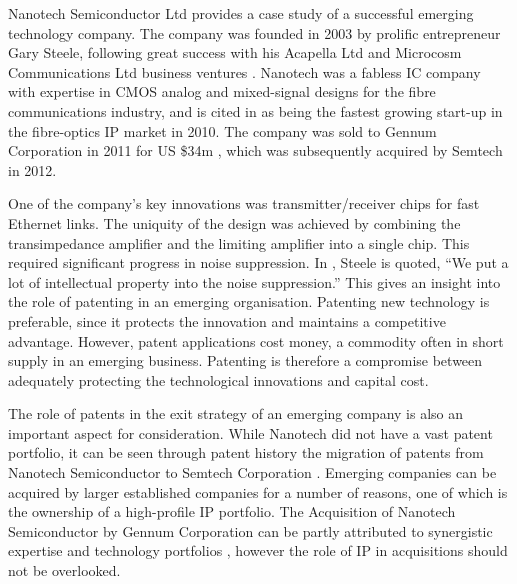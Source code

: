 {}
Nanotech Semiconductor Ltd provides a case study of a successful emerging technology company. 
The company was founded in 2003 by prolific entrepreneur Gary Steele, following great success with his Acapella Ltd and Microcosm Communications Ltd business ventures \cite{GazNesta}.
Nanotech was a fabless IC company with expertise in CMOS analog and mixed-signal designs for the fibre communications industry, and is cited in \cite{GazLightwave} as being the fastest growing start-up in the fibre-optics IP market in 2010.
The company was sold to Gennum Corporation in 2011 for US \$34m \cite{GazBloom}, which was subsequently acquired by Semtech in 2012.
 
One of the company's key innovations was transmitter/receiver chips for fast Ethernet links.
The uniquity of the design was achieved by combining the transimpedance amplifier and the limiting amplifier into a single chip.
This required significant progress in noise suppression.
In \cite{GazEW}, Steele is quoted, ``We put a lot of intellectual property into the noise suppression.''
This gives an insight into the role of patenting in an emerging organisation.
Patenting new technology is preferable, since it protects the innovation and maintains a competitive advantage.
However, patent applications cost money, a commodity often in short supply in an emerging business.
Patenting is therefore a compromise between adequately protecting the technological innovations and capital cost.

The role of patents in the exit strategy of an emerging company is also an important aspect for consideration.
While Nanotech did not have a vast patent portfolio, it can be seen through patent history the migration of patents from Nanotech Semiconductor to Semtech Corporation \cite{nuttgens2013closed1} \cite{nuttgens2013closed2}.
Emerging companies can be acquired by larger established companies for a number of reasons, one of which is the ownership of a high-profile IP portfolio.
The Acquisition of Nanotech Semiconductor by Gennum Corporation can be partly attributed to synergistic expertise and technology portfolios \cite{GazBloom}, however the role of IP in acquisitions should not be overlooked.
 
